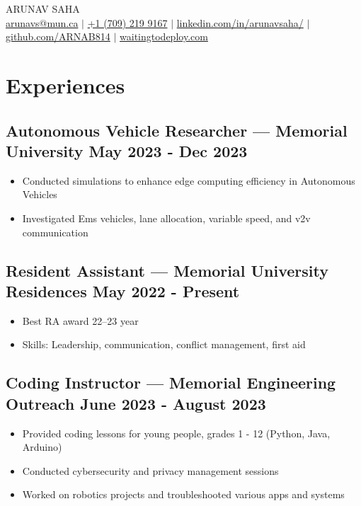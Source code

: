 \documentclass[10pt]{article}
\begin{document}
\begin{center}
    {\fontsize{32}{32}\selectfont\interthin ARUNAV SAHA} \\ \bigskip
    {\color{icnclr}\faEnvelope[regular]} \href{mailto:arunavs@mun.ca}{arunavs@mun.ca} $|$ 
    {\color{icnclr}} \href{tel:+17092199167}{+1 (709) 219 9167} $|$
    {\color{icnclr}\faLinkedinIn} \href{https://www.linkedin.com/in/arunavsaha/}{linkedin.com/in/arunavsaha/} $|$
    {\color{icnclr}\faGithub} \href{https://github.com/ARNAB814}{github.com/ARNAB814} $|$
    {\color{icnclr}\faGlobe} \href{http://waitingtodeploy.com}{waitingtodeploy.com}
\end{center}

\section{Experiences}
\subsection{Autonomous Vehicle Researcher — Memorial University \hfill May 2023 - Dec 2023}
\begin{itemize}
    \item Conducted simulations to enhance edge computing efficiency in Autonomous Vehicles
    \item Investigated Ems vehicles, lane allocation, variable speed, and v2v communication
\end{itemize}

\subsection{Resident Assistant — Memorial University Residences \hfill May 2022 - Present}
\begin{itemize}
    \item Best RA award 22–23 year
    \item Skills: Leadership, communication, conflict management, first aid
\end{itemize}

\subsection{Coding Instructor — Memorial Engineering Outreach \hfill June 2023 - August 2023}
\begin{itemize}
    \item Provided coding lessons for young people, grades 1 - 12 (Python, Java, Arduino)
    \item Conducted cybersecurity and privacy management sessions
    \item Worked on robotics projects and troubleshooted various apps and systems
\end{itemize}
\end{document}
